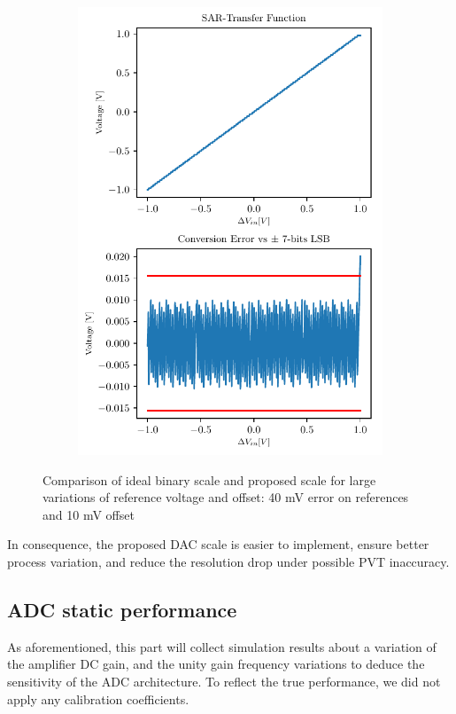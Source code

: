 \begin{figure}[htp]
\begin{subfigure}[b]{0.4\textwidth}
		\includegraphics[width=\textwidth]{Chapter4/Figs/results/sar_resilience/sar-osr6-done-40mVref-10mVoffset.pdf}
	\end{subfigure}
	\caption{Comparison of ideal binary scale and proposed scale for large variations of reference voltage and offset: 40 mV error on references and 10 mV offset}
	\label{fig:sar-ideal-proposed-scale}
\end{figure}

In consequence, the proposed DAC scale is easier to implement, ensure better process variation, and reduce the resolution drop under possible PVT inaccuracy.

\subsection{ADC static performance}
As aforementioned, this part will collect simulation results about a variation of the amplifier DC gain, and the unity gain frequency variations to deduce the sensitivity of the ADC architecture. To reflect the true performance, we did not apply any calibration coefficients.

